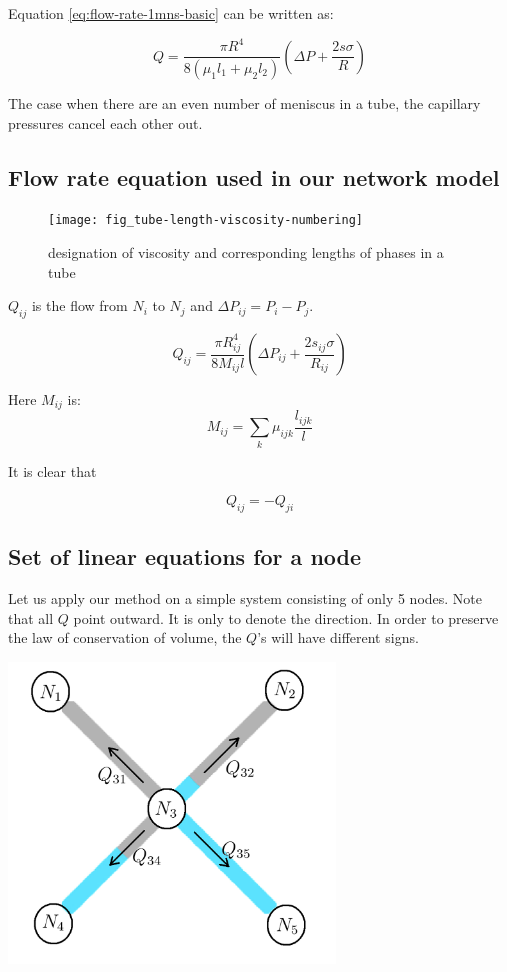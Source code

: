 	Equation \ref{eq:flow-rate-1mns-basic} can be written as:
	
	\begin{equation} \label{eq:flow-rate-1mns-complex}
		Q = \frac{\pi R^4}{8({\mu}_1 l_1 + {\mu}_2 l_2)} \left( \Delta P + \frac{2s\sigma}{R} \right)
	\end{equation}
	
	The case when there are an even number of meniscus in a tube, the capillary pressures cancel each other out.

\subsection{Flow rate equation used in our network model}
	\begin{figure}[H]
		\texttt{[image: fig\_tube-length-viscosity-numbering]}
		\caption{designation of viscosity and corresponding lengths of phases in a tube}
		\label{fig_tube-length-viscosity-numbering}
	\end{figure}
	
	$Q_{ij}$ is the flow from $N_i$ to $N_j$ and $\Delta P_{ij} = P_i - P_j$.
	
	\begin{equation} \label{eq:flow-rate-main}
		\boxed{Q_{ij} = \frac{\pi R_{ij}^4}{8M_{ij}l} \left(\Delta P_{ij} + \frac{2s_{ij}\sigma}{R_{ij}} \right)}
	\end{equation}
	
	Here $M_{ij}$ is:
	\[ {M}_{ij} = \sum_{k} {\mu}_{ijk} \frac{l_{ijk}}{l} \]
	 
	It is clear that

	\begin{equation}
		Q_{ij} = -Q_{ji}
	\end{equation}


\subsection{Set of linear equations for a node} \label{sec:linear-equ}

	Let us apply our method on a simple system consisting of only 5 nodes.
	Note that all $Q$ point outward. It is only to denote the direction. In order to preserve the law of conservation of volume, the $Q$'s will have different signs.

	\includegraphics[height=8cm]{figures/fig_simple-5-nodes}

